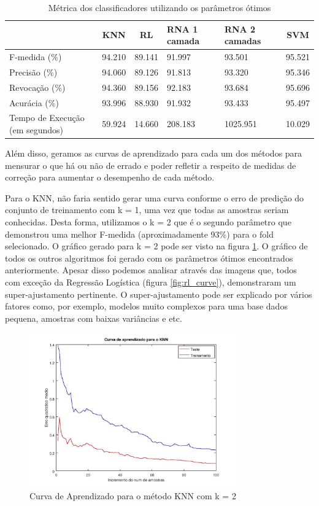 \documentclass[10pt, conference, compsocconf]{IEEEtran}
\begin{document}
\begin{table}[!t]
\renewcommand{\arraystretch}{1.3}
\caption{Métrica dos classificadores utilizando os parâmetros ótimos}
\label{metrica_otimos}
\centering
\begin{tabular}{|p{1.8cm}|c|c|p{1cm}|p{1cm}|c|}
\hline
    & KNN & RL & RNA 1 camada & RNA 2
    camadas & SVM\\
\hline
F-medida (\%) & 94.210 & 89.141 & 91.997 & 93.501 & 95.521 \\
Precisão (\%) & 94.060 & 89.126 & 91.813 & 93.320 & 95.346 \\
Revocação (\%) & 94.360 & 89.156 & 92.183 & 93.684 & 95.696 \\
Acurácia (\%) & 93.996 & 88.930 & 91.932 & 93.433 & 95.497 \\
Tempo de Execução (em segundos) & 59.924 & 14.660 & 208.183 & 1025.951 & 10.029 \\
\hline
\end{tabular}
\end{table}

Além disso, geramos as curvas de aprendizado para cada um dos métodos para
mensurar o que há ou não de errado e poder refletir a respeito de medidas de
correção para aumentar o desempenho de cada método. 

Para o KNN, não faria sentido gerar uma curva conforme o erro de predição do conjunto de treinamento com k = 1, uma vez que todas as amostras seriam conhecidas. Desta forma, utilizamos o k = 2 que é o segundo parâmetro que demonstrou uma melhor F-medida (aproximadamente 93\%) para o fold selecionado. O gráfico gerado para k = 2 pode ser visto na figura \ref{fig:knn_curve}.
O gráfico de todos os outros algoritmos foi gerado com os parâmetros ótimos encontrados anteriormente. Apesar disso podemos analisar através das imagens que, todos com exceção da Regressão Logística (figura \ref{fig:rl_curve}), demonstraram um super-ajustamento pertinente. O super-ajustamento pode ser explicado por vários fatores como, por exemplo, modelos muito complexos para uma base dados pequena, amostras com baixas variâncias e etc.

\begin{figure}[!t]
\centering
\includegraphics[width=3.5in]{imgs/KNNk2Curve.jpg}
\caption{Curva de Aprendizado para o método KNN com k = 2}
\label{fig:knn_curve}
\end{figure}
\end{document}
